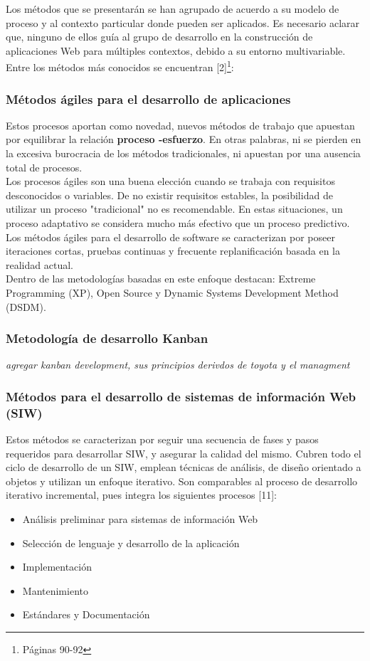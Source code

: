 Los métodos que se presentarán se han agrupado de acuerdo a su modelo de proceso y al contexto particular donde 
pueden ser aplicados. Es necesario aclarar que, ninguno de ellos guía al grupo de desarrollo en la construcción de 
aplicaciones Web para múltiples contextos, debido a su entorno multivariable. Entre los métodos más conocidos se 
encuentran [2]\footnote{Páginas 90-92}:

\subsubsection{Métodos ágiles para el desarrollo de aplicaciones}
Estos procesos aportan como novedad, nuevos métodos de trabajo que apuestan por equilibrar la relación \textbf{proceso
-esfuerzo}. En otras palabras, ni se pierden en la excesiva burocracia de los métodos tradicionales, ni apuestan por una 
ausencia total de procesos.\\

Los procesos ágiles son una buena elección cuando se trabaja con requisitos desconocidos o variables. De no existir
requisitos estables, la posibilidad de utilizar un proceso "tradicional" no es recomendable. En estas situaciones, un 
proceso adaptativo se considera mucho más efectivo que un proceso predictivo. Los métodos ágiles para el desarrollo de 
software se caracterizan por poseer iteraciones cortas, pruebas continuas y frecuente replanificación basada en la 
realidad actual.\\

Dentro de las metodologías basadas en este enfoque destacan: Extreme Programming (XP), Open Source y Dynamic Systems 
Development Method (DSDM).

\subsubsection{Metodología de desarrollo Kanban}
\textit{agregar kanban development, sus principios derivdos de toyota y el managment}

\subsubsection{Métodos para el desarrollo de sistemas de información Web (SIW) }
Estos métodos se caracterizan por seguir una secuencia de fases y pasos requeridos para desarrollar SIW, y asegurar la 
calidad del mismo. Cubren todo el ciclo de desarrollo de un SIW, emplean técnicas de análisis, de  diseño orientado
a objetos y utilizan un enfoque iterativo. 
Son comparables al proceso de desarrollo iterativo incremental, pues integra los siguientes procesos [11]:
\begin{itemize}
 \item Análisis preliminar para sistemas de información Web
 \item Selección de lenguaje y desarrollo de la aplicación
 \item Implementación
 \item Mantenimiento
 \item Estándares y Documentación
\end{itemize}

